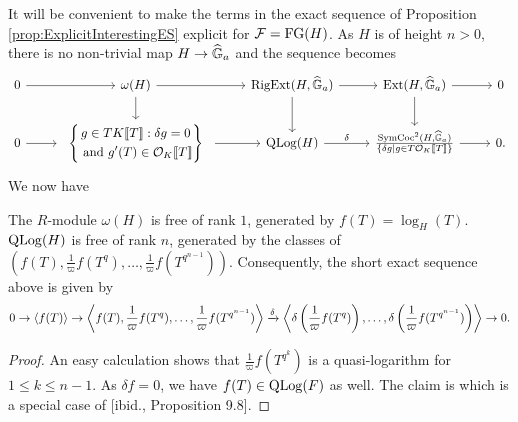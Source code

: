 It will be convenient to make the terms in the exact sequence of Proposition 
\ref{prop:ExplicitInterestingES} explicit for $\mathcal{F} = \textnormal{FG}(H)$. As $H$ is of height $n>0$, 
there is no non-trivial map $H \to \widehat{\mathbb{G}}_a$ and the sequence becomes
\begin{equation*}
\begin{tikzcd}[ampersand replacement=\&]
	0 \& {\omega(H)} \& {\RigExt(H,\GG_a)} \& {\Ext(H,\GG_a)} \& 0 \\
	0 \& \begin{array}{c} \left\{\begin{gathered} {g \in TK\llbr T \rrbr : \delta g = 0} \\          \text{ and $g'(T) \in \cO_K\llbr T \rrbr$}\end{gathered} \right\} \end{array} \& {\QLog(H)} \& {\frac{\SymCoc^2(H, \GG_a)}{\{\delta g \mid g \in T \cO_K\llbr T \rrbr\}}} \& 0.
	\arrow[from=1-1, to=1-2]
	\arrow[from=1-2, to=1-3]
	\arrow[from=1-2, to=2-2]
	\arrow[from=1-3, to=1-4]
	\arrow[from=1-3, to=2-3]
	\arrow[from=1-4, to=1-5]
	\arrow[from=1-4, to=2-4]
	\arrow["", from=2-1, to=2-2]
	\arrow[from=2-2, to=2-3]
	\arrow["\delta", from=2-3, to=2-4]
	\arrow[from=2-4, to=2-5]
\end{tikzcd}   
\end{equation*}
We now have 
\begin{prop}
  The $R$-module $\omega(H)$ is free of rank $1$, generated by 
  $f(T) = \log_H(T)$. $\operatorname {QLog}(H)$ is free of rank $n$, generated by the classes of
  $(f(T), \frac 1\varpi f(T^q), \dots, \frac 1\varpi f(T^{q^{n-1}}))$. Consequently,
  the short exact sequence above is given by 
  \begin{equation*}
    0 \to \left \langle f(T) \right \rangle \to \left \langle f(T), \frac 1\varpi
      f(T^q) , \dots,
    \frac 1\varpi f(T^{q^{n-1}}) \right \rangle \xrightarrow{\delta} 
    \left \langle \delta \left(\frac 1\varpi f(T^q)\right),\dots, \delta
    \left(\frac 1\varpi f(T^{q^{n-1}})\right ) \right \rangle \to 0.
  \end{equation*}
\begin{proof}
  An easy calculation shows that $\frac 1\varpi f(T^{q^k})$ is a quasi-logarithm for 
  $1 \leq k \leq n-1$. As $\delta f = 0$, we have $f(T) \in \operatorname {QLog}(F)$ as well. 
  The claim is \cite[Proposition 13.8]{hopkins1994equivariant} which is a 
  special case of [ibid., Proposition 9.8].
\end{proof}
\end{prop}


